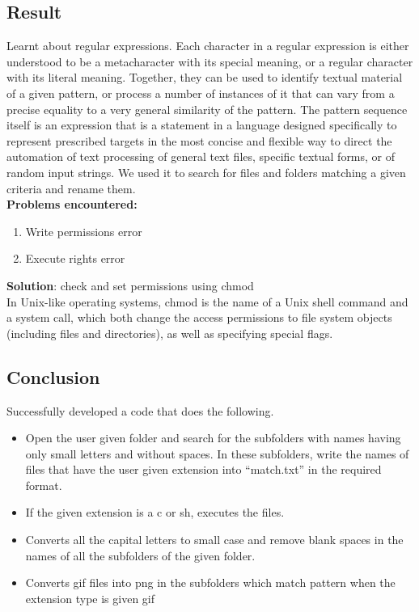 \documentclass[paper=a4, fontsize=11pt]{scrartcl} %
\numberwithin{equation}{section} %
\numberwithin{figure}{section} %
\numberwithin{table}{section} %
\begin{document}
\subsection{Result}

Learnt about regular expressions. Each character in a regular expression is either understood to be a metacharacter with its special meaning, or a regular character with its literal meaning. Together, they can be used to identify textual material of a given pattern, or process a number of instances of it that can vary from a precise equality to a very general similarity of the pattern. The pattern sequence itself is an expression that is a statement in a language designed specifically to represent prescribed targets in the most concise and flexible way to direct the automation of text processing of general text files, specific textual forms, or of random input strings. We used it to search for files and folders matching a given criteria and rename them.\\

\textbf{Problems encountered:}
\begin{enumerate}
\item Write permissions error
\item Execute rights error
\end{enumerate}

\textbf{Solution}: check and set permissions using chmod\\
In Unix-like operating systems, chmod is the name of a Unix shell command and a system call, which both change the access permissions to file system objects (including files and directories), as well as specifying special flags.


\subsection{Conclusion}
Successfully developed a code that does the following.
\begin {itemize}
\item Open the user given folder and search for the subfolders with names having only small letters and without
spaces. In these subfolders, write the names of files that have the user given extension into “match.txt” in the required format.
\item If the given extension is a c or sh, executes the files.
\item Converts all the capital letters to small case and remove blank spaces in the names of all the subfolders
of the given folder.
\item Converts gif files into png in the subfolders which match pattern when the extension type is given gif
\end{itemize}
\end{document}
